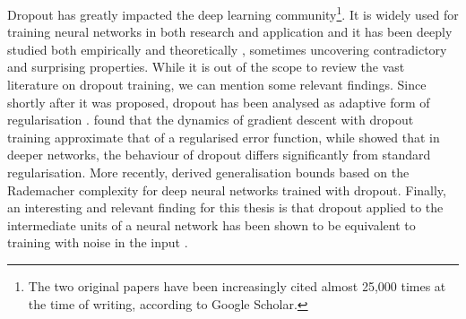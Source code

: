 {Dropout has greatly impacted the deep learning community\footnote{The two original papers have been increasingly cited almost 25,000 times at the time of writing, according to Google Scholar.}. It is widely used for training neural networks in both research and application and it has been deeply studied both empirically and theoretically \citep{gal2016dropout}, sometimes uncovering contradictory and surprising properties. While it is out of the scope to review the vast literature on dropout training, we can mention some relevant findings. Since shortly after it was proposed, dropout has been analysed as adaptive form of regularisation \citep{wager2013dropout}. \citet{baldi2013dropout} found that the dynamics of gradient descent with dropout training approximate that of a regularised error function, while \citet{helmbold2017dropout} showed that in deeper networks, the behaviour of dropout differs significantly from standard regularisation. More recently, \citet{mou2018dropout} derived generalisation bounds based on the Rademacher complexity for deep neural networks trained with dropout. Finally, an interesting and relevant finding for this thesis is that dropout applied to the intermediate units of a neural network has been shown to be equivalent to training with noise in the input \citep{bouthillier2015dropoutasdaug}.

\chapterbibliography
}
